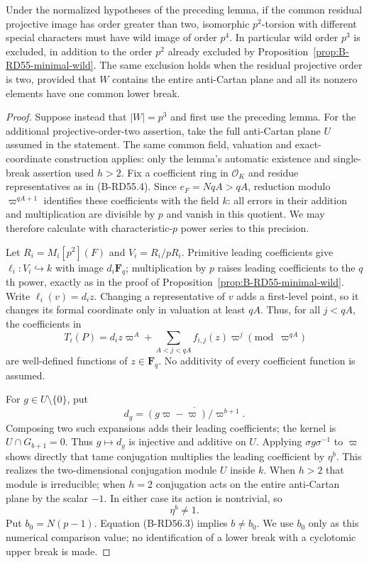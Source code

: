 \begin{proposition}
\label{prop:B-RD56-cubic-wild}
Under the normalized hypotheses of the preceding lemma, if the
common residual projective image has order greater than two,
isomorphic $p^2$-torsion with different special characters must
have wild image of order $p^4$. In particular wild order $p^3$
is excluded, in addition to the order $p^2$ already excluded by
Proposition~\ref{prop:B-RD55-minimal-wild}.
The same exclusion holds when the residual projective order is two,
provided that $W$ contains the entire anti-Cartan plane and all its
nonzero elements have one common lower break.
\end{proposition}
\begin{proof}
Suppose instead that $|W|=p^3$ and first use the preceding lemma.
For the additional projective-order-two assertion, take the full
anti-Cartan plane $U$ assumed in the statement. The same common field,
valuation and exact-coordinate construction applies: only the lemma's
automatic existence and single-break assertion used $h>2$.
Fix a coefficient ring in $\mathcal O_K$ and residue representatives
as in (B-RD55.4). Since $e_F=NqA>qA$, reduction modulo
$\varpi^{qA+1}$ identifies these coefficients with the field $k$:
all errors in their addition and multiplication are divisible by
$p$ and vanish in this quotient. We may therefore calculate with
characteristic-$p$ power series to this precision.

Let $R_i=M_i[p^2](F)$ and $V_i=R_i/pR_i$. Primitive leading
coefficients give $\ell_i:V_i\hookrightarrow k$ with image
$d_i\mathbf F_q$; multiplication by $p$ raises leading coefficients
to the $q$th power, exactly as in the proof of
Proposition~\ref{prop:B-RD55-minimal-wild}. Write $\ell_i(v)=d_i z$.
Changing a representative of $v$ adds a first-level point, so it
changes its formal coordinate only in valuation at least $qA$.
Thus, for all $j<qA$, the coefficients in
\[
 T_i(P)=d_i z\varpi^A+
                \sum_{A<j<qA} f_{i,j}(z)\varpi^j
                     \pmod{\varpi^{qA}}                \tag{B-RD56.2}
\]
are well-defined functions of $z\in\mathbf F_q$.
No additivity of every coefficient function is assumed.

For $g\in U\setminus\{0\}$, put
\[
 d_g=\overline{(g\varpi-\varpi)/\varpi^{b+1}}.
\]
Composing two such expansions adds their leading coefficients;
the kernel is $U\cap G_{b+1}=0$. Thus $g\mapsto d_g$ is
injective and additive on $U$. Applying
$\sigma g\sigma^{-1}$ to $\varpi$ shows directly that tame
conjugation multiplies the leading coefficient by $\eta^b$.
This realizes the two-dimensional conjugation module $U$ inside $k$.
When $h>2$ that module is irreducible; when $h=2$ conjugation acts
on the entire anti-Cartan plane by the scalar $-1$. In either case
its action is nontrivial, so
\[
                         \eta^b\ne1.                  \tag{B-RD56.3}
\]
Put $b_0=N(p-1)$. Equation (B-RD56.3) implies $b\ne b_0$.
We use $b_0$ only as this numerical comparison value; no identification
of a lower break with a cyclotomic upper break is made.


\end{proof}
